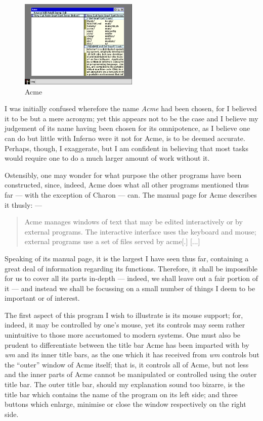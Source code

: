 \documentclass[a5paper,twoside,12pt]{report}
\begin{document}
    \begin{figure}
      \centering
      \includegraphics[width=0.5\textwidth]{imgs/acme.png}
      \caption{Acme}
    \end{figure}

    I was initially confused wherefore the name \textit{Acme} had been chosen, for I believed it to be but a mere acronym; yet this appears not to be the case and I believe my judgement of its name having been chosen for its omnipotence, as I believe one can do but little with Inferno were it not for Acme, is to be deemed accurate. Perhaps, though, I exaggerate, but I am confident in believing that most tasks would require one to do a much larger amount of work without it.

    Ostensibly, one may wonder for what purpose the other programs have been constructed, since, indeed, Acme does what all other programs mentioned thus far — with the exception of Charon — can. The manual page for Acme describes it thusly: —

    \begin{quote}
        Acme manages windows of text that may be edited interactively or by external programs. The interactive interface uses the keyboard and mouse; external programs use a set of files served by acme[.] [...]
   \end{quote}

   Speaking of its manual page, it is the largest I have seen thus far, containing a great deal of information regarding its functions. Therefore, it shall be impossible for us to cover all its parts in-depth — indeed, we shall leave out a fair portion of it — and instead we shall be focussing on a small number of things I deem to be important or of interest.

   The first aspect of this program I wish to illustrate is its mouse support; for, indeed, it may be controlled by one's mouse, yet its controls may seem rather unintuitive to those more accustomed to modern systems. One must also be prudent to differentiate between the title bar Acme has been imparted with by \textit{wm} and its inner title bars, as the one which it has received from \textit{wm} controls but the ``outer'' window of Acme itself; that is, it controls all of Acme, but not less and the inner parts of Acme cannot be manipulated or controlled using the outer title bar. The outer title bar, should my explanation sound too bizarre, is the title bar which contains the name of the program on its left side; and three buttons which enlarge, minimise or close the window respectively on the right side.
\end{document}
